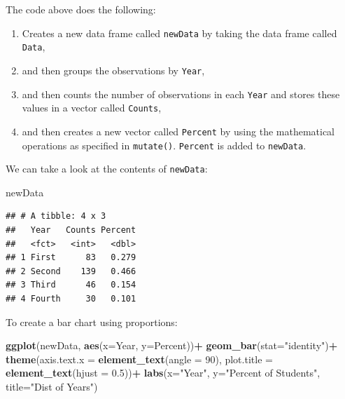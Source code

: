 \documentclass[
]{book}
\newenvironment{Shaded}{\begin{snugshade}}{\end{snugshade}}
\newcommand{\AttributeTok}[1]{\textcolor[rgb]{0.13,0.29,0.53}{#1}}
\newcommand{\DecValTok}[1]{\textcolor[rgb]{0.00,0.00,0.81}{#1}}
\newcommand{\FloatTok}[1]{\textcolor[rgb]{0.00,0.00,0.81}{#1}}
\newcommand{\FunctionTok}[1]{\textcolor[rgb]{0.13,0.29,0.53}{\textbf{#1}}}
\newcommand{\NormalTok}[1]{#1}
\newcommand{\SpecialCharTok}[1]{\textcolor[rgb]{0.81,0.36,0.00}{\textbf{#1}}}
\newcommand{\StringTok}[1]{\textcolor[rgb]{0.31,0.60,0.02}{#1}}
\providecommand{\tightlist}{%
  \setlength{\itemsep}{0pt}\setlength{\parskip}{0pt}}
\begin{document}
The code above does the following:

\begin{enumerate}
\def\labelenumi{\arabic{enumi}.}
\tightlist
\item
  Creates a new data frame called \texttt{newData} by taking the data frame called \texttt{Data},
\item
  and then groups the observations by \texttt{Year},
\item
  and then counts the number of observations in each \texttt{Year} and stores these values in a vector called \texttt{Counts},
\item
  and then creates a new vector called \texttt{Percent} by using the mathematical operations as specified in \texttt{mutate()}. \texttt{Percent} is added to \texttt{newData}.
\end{enumerate}

We can take a look at the contents of \texttt{newData}:

\begin{Shaded}
\begin{Highlighting}[]
\NormalTok{newData}
\end{Highlighting}
\end{Shaded}

\begin{verbatim}
## # A tibble: 4 x 3
##   Year   Counts Percent
##   <fct>   <int>   <dbl>
## 1 First      83   0.279
## 2 Second    139   0.466
## 3 Third      46   0.154
## 4 Fourth     30   0.101
\end{verbatim}

To create a bar chart using proportions:

\begin{Shaded}
\begin{Highlighting}[]
\FunctionTok{ggplot}\NormalTok{(newData, }\FunctionTok{aes}\NormalTok{(}\AttributeTok{x=}\NormalTok{Year, }\AttributeTok{y=}\NormalTok{Percent))}\SpecialCharTok{+}
  \FunctionTok{geom\_bar}\NormalTok{(}\AttributeTok{stat=}\StringTok{"identity"}\NormalTok{)}\SpecialCharTok{+}
  \FunctionTok{theme}\NormalTok{(}\AttributeTok{axis.text.x =} \FunctionTok{element\_text}\NormalTok{(}\AttributeTok{angle =} \DecValTok{90}\NormalTok{), }
        \AttributeTok{plot.title =} \FunctionTok{element\_text}\NormalTok{(}\AttributeTok{hjust =} \FloatTok{0.5}\NormalTok{))}\SpecialCharTok{+}
  \FunctionTok{labs}\NormalTok{(}\AttributeTok{x=}\StringTok{"Year"}\NormalTok{, }\AttributeTok{y=}\StringTok{"Percent of Students"}\NormalTok{, }\AttributeTok{title=}\StringTok{"Dist of Years"}\NormalTok{)}
\end{Highlighting}
\end{Shaded}
\end{document}

